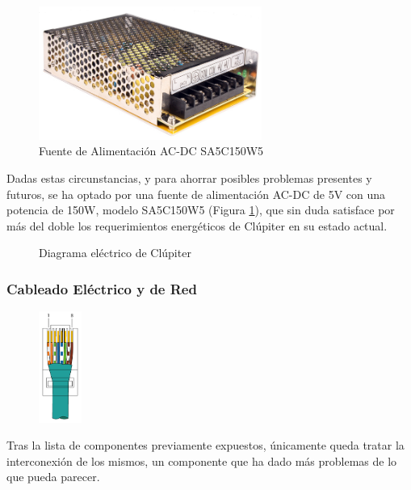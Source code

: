 \begin{figure}[h!]
  \vspace*{0.5cm}
  \centering
  \includegraphics[width=0.65\textwidth]{img/psu.jpg}
  \caption{Fuente de Alimentación AC-DC SA5C150W5}
  \label{fig:psu_photo}
  \vspace*{0.1cm}
\end{figure}

Dadas estas circunstancias, y para ahorrar posibles problemas presentes y futuros, se ha optado por una fuente de alimentación AC-DC de 5V con una potencia de 150W, modelo SA5C150W5 (Figura \ref{fig:psu_photo}), que sin duda satisface por más del doble los requerimientos energéticos de Clúpiter en su estado actual.

\begin{figure}[H]
  \centering
  \vspace*{0.5cm}
  \def\svgwidth{\textwidth}
  
  \caption{Diagrama eléctrico de Clúpiter}
  \label{fig:raspi_electric_diagram}
\end{figure}

\subsubsection{Cableado Eléctrico y de Red}
\label{sssec:cableado_electrico_red}
\begin{figure}
  \centering
  \vspace*{-1.25cm}
  \includegraphics[width=0.125\textwidth]{img/TIA-568B.png}
  \label{fig:TIA-568B}
\end{figure}
Tras la lista de componentes previamente expuestos, únicamente queda tratar la interconexión de los mismos, un componente que ha dado más problemas de lo que pueda parecer.

